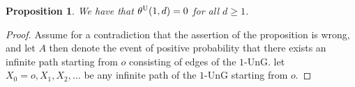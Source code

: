\documentclass{article}
\newtheorem{prop}[theorem]{Proposition}
\theoremstyle{definition}
\newcommand{\1}{\mathbbm{1}}
\newcommand{\0}{\mathbf{o}}
\begin{document}
\begin{prop}\label{prop-U1}
    We have that $\theta^{\rm U}(1,d)=0$ for all $d \geq 1$.
\end{prop}
\begin{proof}
Assume for a contradiction that the assertion of the proposition is wrong, and let $A$ then denote the event of positive probability that there exists an infinite path starting from $o$ consisting of edges of the $1$-UnG. %
let $X_0=o,X_1,X_2,\ldots$ be any infinite path of the $1$-UnG starting from $o$.

\end{proof}
\end{document}
